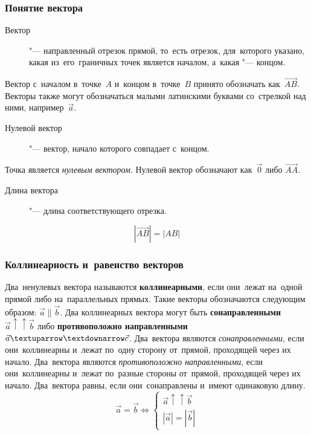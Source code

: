 \documentclass[]{scrartcl}
\begin{document}
\subsubsection{Понятие вектора}
\begin{description}
	\item[Вектор] "--- направленный отрезок прямой, то~есть отрезок, для~которого указано, какая из~его~граничных точек является началом, а~какая "--- концом.
\end{description}
Вектор с~началом в~точке~${\textstyle A}$ и~концом в~точке~${\textstyle B}$ принято обозначать как~${\textstyle {\overrightarrow {AB}}}$. Векторы также могут обозначаться малыми латинскими буквами со~стрелкой над ними, например~${\textstyle {\vec {a}}}$.
\begin{description}
	\item[Нулевой вектор] "--- вектор, начало которого совпадает с~концом.
\end{description}
Точка является \emph{нулевым вектором}. Нулевой вектор обозначают как~${\textstyle {\vec {0}}}$ либо ${\textstyle {\overrightarrow {AA}}}$.
\begin{description}
	\item[Длина вектора] "--- длина соответствующего отрезка.
\end{description}
\begin{equation}\label{eq:vector-lenght}
|{\overrightarrow {AB}}|=|AB|
\end{equation}
\subsubsection{Коллинеарность и~равенство векторов}
Два~ненулевых вектора называются \textbf{коллинеарными}, если они~лежат на~одной прямой либо на~параллельных прямых. Такие векторы обозначаются следующим образом: ${\textstyle \vec{a} \parallel \vec{b}}$. Два коллинеарных вектора могут быть \textbf{сонаправленными} ${\textstyle \vec{a} \uparrow \uparrow   \vec{b}}$ либо \textbf{противоположно направленными} ${\textstyle \vec{a} \textuparrow \textdownarrow \vec{c}}$. Два~вектора являются \emph{сонаправленными}, если они~коллинеарны и~лежат по~одну сторону от~прямой, проходящей через их начало. Два~вектора являются \emph{противоположно направленными}, если они~коллинеарны и~лежат по~разные стороны от~прямой, проходящей через их начало.
Два~вектора равны, если они~сонаправлены и~имеют одинаковую длину.
\begin{equation}\label{eq:vec-equality}
\vec{a}=\vec{b} \Leftrightarrow
	\begin{cases}
	\vec{a}\uparrow \uparrow \vec{b}\\
	|\vec{a}|=|\vec{b}|
	\end{cases}
\end{equation}
\end{document}
